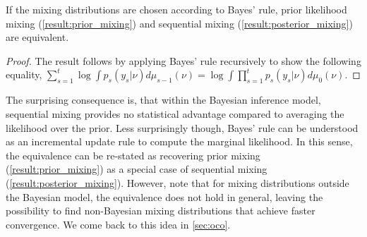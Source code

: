 \begin{theorem}\label{result:mixing-equivalence} If the mixing distributions are chosen according to Bayes' rule, prior likelihood mixing (\cref{result:prior_mixing}) and sequential mixing (\cref{result:posterior_mixing}) are equivalent.
\end{theorem}
\begin{proof}
   The result follows by applying Bayes' rule recursively to show the following equality, $\sum_{s=1}^t \log \int p_s(y_s|\nu) d\mu_{s-1}(\nu) = \log \int \prod_{s=1}^t p_s(y_s|\nu) d\mu_{0}(\nu)$.
\end{proof}

The surprising consequence is, that within the Bayesian inference model, sequential mixing provides no statistical advantage compared to averaging the likelihood over the prior. Less surprisingly though, Bayes' rule can be understood as an incremental update rule to compute the marginal likelihood. In this sense, the equivalence can be re-stated as recovering prior mixing (\cref{result:prior_mixing}) as a special case of sequential mixing (\cref{result:posterior_mixing}). However, note that for mixing distributions outside the Bayesian model, the equivalence does not hold in general, leaving the possibility to find non-Bayesian mixing distributions that achieve faster convergence. We come back to this idea in \cref{sec:oco}.

